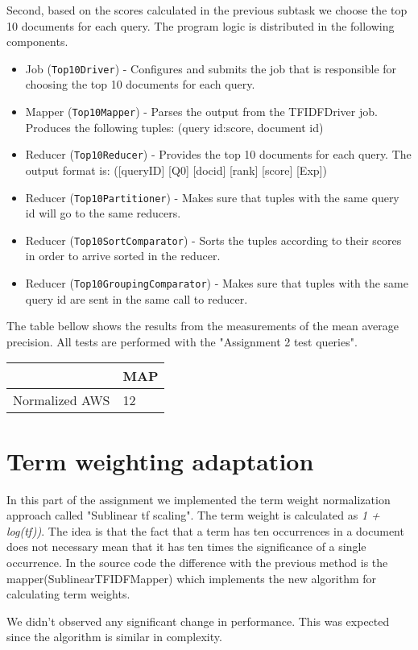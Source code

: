 \documentclass[a4paper, notitlepage]{report}
\begin{document}
Second, based on the scores calculated in the previous subtask we choose the top 10 documents for each query. The program logic is distributed in the following components.

\begin{itemize}
	\item Job (\lstinline{Top10Driver}) - Configures and submits the job that is responsible for choosing the top 10 documents for each query.
	\item Mapper (\lstinline{Top10Mapper}) - Parses the output from the TFIDFDriver job. Produces the following tuples: (query id:score, document id)
	\item Reducer (\lstinline{Top10Reducer}) - Provides the top 10 documents for each query. The output format is: ([queryID] [Q0] [docid] [rank] [score] [Exp])
  
	\item Reducer (\lstinline{Top10Partitioner}) - Makes sure that tuples with the same query id will go to the same reducers.
	
	\item Reducer (\lstinline{Top10SortComparator}) - Sorts the tuples according to their scores in order to arrive sorted in the reducer.
	
	\item Reducer (\lstinline{Top10GroupingComparator}) - Makes sure that tuples with the same query id are sent in the same call to reducer.
	
\end{itemize}

The table bellow shows the results from the measurements of the mean average precision. All tests are performed with the "Assignment 2 test queries".
\begin{center}
	\begin{tabular}{ | l | l | }
    	\hline
     & MAP\\ \hline
    Normalized AWS & 12  \\ \hline
    \hline
    \end{tabular}
\end{center}

\section{Term weighting adaptation}
In this part of the assignment we implemented the term weight normalization approach called "Sublinear tf scaling". The term weight is calculated as \emph{1 + log(tf))}. The idea is that the fact that a term has ten occurrences in a document does not necessary mean that it has ten times the significance of a single occurrence. In the source code the difference with the previous method is the mapper(SublinearTFIDFMapper) which implements the new algorithm for calculating term weights.

We didn't observed any significant change in performance. This was expected since the algorithm is similar in complexity.
\end{document}
